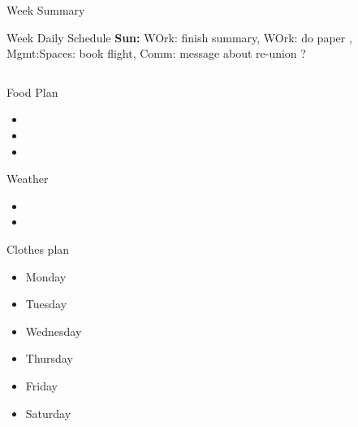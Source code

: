 \documentclass[serif, mathserif, final]{beamer}
\begin{document}
\begin{frame}
\begin{columns}
\begin{column}{0.5\linewidth}
\begin{block}{Week Summary}
      \begin{block}{Week Daily Schedule} 
        {\bf Sun:} WOrk: finish summary,   WOrk: do paper ,
        Mgmt:Spaces: book flight, Comm: message about re-union ? 
      \end{block} 
      
      \begin{column}{0.25\linewidth}
        
        \begin{block}{Food Plan} 
          \begin{itemize}
            \tiny \item \tiny 
          \item \tiny 
          \item \tiny 
          \end{itemize}
        \end{block} 
        
        \begin{block}{Weather}
          \begin{itemize}
            \tiny \item \tiny 
          \item \tiny
          \end{itemize}
        \end{block} 

      \begin{block}{Clothes plan} 
        \begin{itemize}
          \tiny \item \tiny Monday
        \item \tiny Tuesday
        \item \tiny Wednesday
        \item \tiny Thursday
        \item \tiny Friday
          \item \tiny Saturday
        \end{itemize} 
      \end{block}




\end{column}
\end{block}
\end{column}
\end{columns}
\end{frame}
\end{document}
